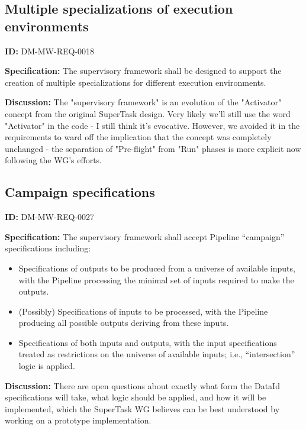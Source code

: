 \documentclass[SE,toc,lsstdraft]{lsstdoc}
\begin{document}
\subsection{Multiple specializations of execution environments}

\label{DM-MW-REQ-0018}
\textbf{ID:} DM-MW-REQ-0018

\textbf{Specification:}
The supervisory framework shall be designed to support the creation of multiple specializations for different execution environments.

\textbf{Discussion:}
The "supervisory framework" is an evolution of the "Activator" concept from the original SuperTask design. Very likely we'll still use the word "Activator" in the code - I still think it's evocative. However, we avoided it in the requirements to ward off the implication that the concept was completely unchanged - the separation of "Pre-flight" from "Run" phases is more explicit now following the WG's efforts.

\subsection{Campaign specifications}

\label{DM-MW-REQ-0027}
\textbf{ID:} DM-MW-REQ-0027

\textbf{Specification:}
The supervisory framework shall accept Pipeline “campaign” specifications including:

    \begin{itemize}
\item
Specifications of outputs to be produced from a universe of available inputs, with the Pipeline processing the minimal set of inputs required to make the outputs.

\item
(Possibly) Specifications of inputs to be processed, with the Pipeline producing all possible outputs deriving from these inputs.

\item
Specifications of both inputs and outputs, with the input specifications treated as restrictions on the universe of available inputs; i.e., “intersection” logic is applied.

    \end{itemize}

\textbf{Discussion:}
There are open questions about exactly what form the DataId specifications will take, what logic should be applied, and how it will be implemented, which the SuperTask WG believes can be best understood by working on a prototype implementation.
\end{document}
